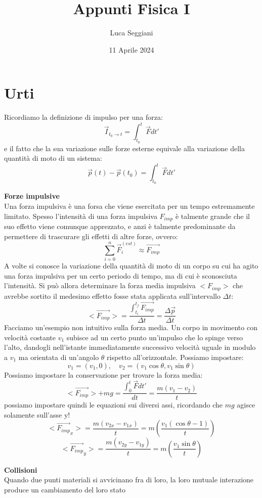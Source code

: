 \documentclass[a4paper,12pt]{article}
\title{Appunti Fisica I}
\author{Luca Seggiani}
\date{11 Aprile 2024}
\begin{document}
\maketitle
\section{Urti}
Ricordiamo la definizione di impulso per una forza:
$$ \vec{I}_{t_0\rightarrow t} = \int_{t_0}^t \vec{F}dt'$$
e il fatto che la sua variazione sulle forze esterne equivale alla variazione della quantità di moto di un sistema:
$$ \vec{p}(t) - \vec{p}(t_0) = \int_{t_0}^t \vec{F}dt' $$

\par\smallskip
\textbf{Forze impulsive} \\
Una forza impulsiva è una forsa che viene esercitata per un tempo estremamente limitato. Spesso
l'intensità di una forza impulsiva $F_{imp}$ è talmente grande che il suo effetto viene comunque apprezzato,
e anzi è talmente predominante da permettere di trascurare gli effetti di altre forze, ovvero:
$$ \sum_{i=0}^n \vec{F}_i^{(est)} \approx \vec{F_{imp}} $$
A volte si conosce la variazione della quantità di moto di un corpo su cui ha agito una forza impulsiva per un
certo periodo di tempo, ma di cui è sconosciuta l'intensità. Si può allora determinare la forza media impulsiva
$<F_{imp}>$ che avrebbe sortito il medesimo effetto fosse stata applicata sull'intervallo $\Delta t$:
$$ <\vec{F_{imp}}> = \frac{\int_{t_i}^{t_f} \vec{F_{imp}}}{\Delta t} = \frac{\Delta \vec{p}}{\Delta t}$$
Facciamo un'esempio non intuitivo sulla forza media. Un corpo in movimento con velocità costante $v_1$ subisce ad un certo
punto un'impulso che lo spinge verso l'alto, dandogli nell'istante immediatamente successivo velocità uguale in modulo
a $v_1$ ma orientata di un'angolo $\theta$ rispetto all'orizzontale. Possiamo impostare:
$$ v_1 = (v_1, 0), \quad v_2 = (v_1\cos{\theta}, v_1\sin{\theta}) $$
Possiamo impostare la conservazione per trovare la forza media:
$$  <\vec{F_{imp}}> + mg = \frac{\int_{0}^{t} \vec{F}dt'}{dt} = \frac{m(v_1-v_2)}{t} $$
possiamo impostare quindi le equazioni sui diversi assi, ricordando che $mg$ agisce solamente sull'asse y!
$$ <\vec{F_{imp}}_x> = \frac{m(v_{2x} - v_{1x})}{t} = m(\frac{v_1(\cos{\theta}-1)}{t}) $$
$$ <\vec{F_{imp}}_y> = \frac{m(v_{2y} - v_{1y})}{t} = m(\frac{v_1\sin{\theta}}{t}) $$
\par\smallskip
\textbf{Collisioni} \\
Quando due punti materiali si avvicinano fra di loro, la loro mutuale interazione produce un cambiamento del loro stato
\end{document}
